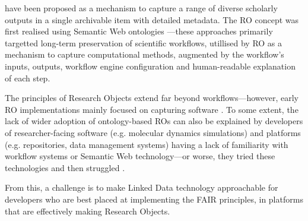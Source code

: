  \cite{Bechhofer 2013} have been proposed as a mechanism to capture a range of diverse scholarly outputs in a single archivable item with detailed metadata. The RO concept was first realised using Semantic Web ontologies \cite{myExperiment 2009,Belhajjame 2015}---these approaches primarily targetted long-term preservation of \glspl{scientific workflow}, utillised by RO as a mechanism to capture computational methods, augmented by the workflow's inputs, outputs, workflow engine configuration and human-readable explanation of each step.

The principles of Research Objects extend far beyond workflows---however, early RO implementations mainly focused on capturing software \cite{Goble 2018}. To some extent, the lack of wider adoption of ontology-based ROs can also be explained by developers of researcher-facing software (e.g. molecular dynamics simulations) and platforms (e.g. repositories, data management systems) having a lack of familiarity with workflow systems or Semantic Web technology---or worse, they tried these technologies and then struggled \cite{Carriero 2010,Tudorache 2020}.

From this, a challenge is to make Linked Data technology approachable for developers who are best placed at implementing the FAIR principles, in platforms that are effectively making Research Objects.

